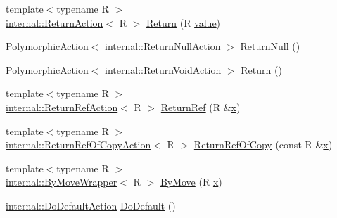 \begin{DoxyCompactItemize}
\item 
{\footnotesize template$<$typename R $>$ }\\\mbox{\hyperlink{classtesting_1_1internal_1_1_return_action}{internal\+::\+Return\+Action}}$<$ R $>$ \mbox{\hyperlink{namespacetesting_adae3994eb444d1ad2dd602454b854663}{Return}} (R \mbox{\hyperlink{_obj__test_2lib_2googletest-master_2googlemock_2test_2gmock-matchers__test_8cc_a337b8a670efc0b086ad3af163f3121b6}{value}})
\item 
\mbox{\hyperlink{classtesting_1_1_polymorphic_action}{Polymorphic\+Action}}$<$ \mbox{\hyperlink{classtesting_1_1internal_1_1_return_null_action}{internal\+::\+Return\+Null\+Action}} $>$ \mbox{\hyperlink{namespacetesting_af05e07c0484961f2a30ba44d1d1816fe}{Return\+Null}} ()
\item 
\mbox{\hyperlink{classtesting_1_1_polymorphic_action}{Polymorphic\+Action}}$<$ \mbox{\hyperlink{classtesting_1_1internal_1_1_return_void_action}{internal\+::\+Return\+Void\+Action}} $>$ \mbox{\hyperlink{namespacetesting_a492ba67db1dfe5dc8257b6e3d38b8183}{Return}} ()
\item 
{\footnotesize template$<$typename R $>$ }\\\mbox{\hyperlink{classtesting_1_1internal_1_1_return_ref_action}{internal\+::\+Return\+Ref\+Action}}$<$ R $>$ \mbox{\hyperlink{namespacetesting_ac17089d5ca6377944d3792fbdc5c5d9b}{Return\+Ref}} (R \&\mbox{\hyperlink{_obj__test_2lib_2googletest-master_2googlemock_2test_2gmock-matchers__test_8cc_a6150e0515f7202e2fb518f7206ed97dc}{x}})
\item 
{\footnotesize template$<$typename R $>$ }\\\mbox{\hyperlink{classtesting_1_1internal_1_1_return_ref_of_copy_action}{internal\+::\+Return\+Ref\+Of\+Copy\+Action}}$<$ R $>$ \mbox{\hyperlink{namespacetesting_ab84f2bf2f22aa75d8b52887bfc7d218c}{Return\+Ref\+Of\+Copy}} (const R \&\mbox{\hyperlink{_obj__test_2lib_2googletest-master_2googlemock_2test_2gmock-matchers__test_8cc_a6150e0515f7202e2fb518f7206ed97dc}{x}})
\item 
{\footnotesize template$<$typename R $>$ }\\\mbox{\hyperlink{structtesting_1_1internal_1_1_by_move_wrapper}{internal\+::\+By\+Move\+Wrapper}}$<$ R $>$ \mbox{\hyperlink{namespacetesting_a38293837852ef2c406b063741018d108}{By\+Move}} (R \mbox{\hyperlink{_obj__test_2lib_2googletest-master_2googlemock_2test_2gmock-matchers__test_8cc_a6150e0515f7202e2fb518f7206ed97dc}{x}})
\item 
\mbox{\hyperlink{classtesting_1_1internal_1_1_do_default_action}{internal\+::\+Do\+Default\+Action}} \mbox{\hyperlink{namespacetesting_ae041df61ff61ccb9753ba15b4309e1a6}{Do\+Default}} ()

\end{DoxyCompactItemize}
